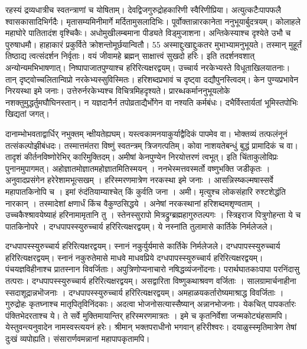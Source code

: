 रहस्यं द्रव्यधात्रीच स्वतन्त्राणां च योषिताम्।
 देवद्विजगुरुद्रोहकारिणी स्वैरिणीप्रिया।
 अत्युत्कटैःपापफलै श्वासकासादिभिर्गदैः।
 मृतासम्यमिनीमार्गे मर्दितामुसलादिभिः।
 पूर्वोक्तान्नारकानेता ननुभूयार्बुदत्रयम्।
 कोलाहले महाघोरे पातितादंश वृश्चिकैः।
 अधोमुखीलम्बमाना पीड्यते विड्मुजाशना।
 अन्तिकेस्याश्च दृश्येते उभौ च पुरुषाधमौ।
 हाहाकारं प्रकुर्विते क्रोशन्तोमूर्छयान्वितौ।
 55 अस्माद्दुःखाद्दुःकतर मुभाभ्यामनुभूयते।
 तस्मान् मुहूर्तं तिष्ठाद्य त्वत्संदर्शन निर्वृताः।
 वयं जीवामहे ब्रह्मन् साक्षात्त्वं सुखदो हरिः।
 इति तदर्शनवशात् अन्योन्यमभिभाषणात्।
 निष्पापाजातपुण्याश्च हरिरित्यक्षरद्वयम्।
 उच्चार्य नरकेभ्यस्ते विधूताखिलयातनाः।
 तान् दृष्ट्वोच्चलितान्विप्रो नरकेभ्यस्सुविस्मितः।
 हरिशब्दप्रभावं च दृष्ट्वा दद्यौपुनस्त्विदम्।
 केन पुण्यप्रभावेन निरयस्था इमे जनाः।
 उत्तेरुर्नरकेभ्यश्च विचित्रमिहदृश्यते।
 प्रारब्धकर्माननुभूयलोके नशक्तुमुद्धर्तुमघौघिनस्तान्।
 न यज्ञदानैर्न तपोव्रताद्यैर्भोगेन वा नश्यति कर्मबंधः।
 दभैर्विस्तार्यतां भूमिस्तपोभिः खिद्यतां जगत्।
 
दानाम्भोभवताद्वार्धिर् नभुक्तम् न्क्षीयतेह्यघम्।
 यस्त्वकामनयाकुर्याद्वैदिकं पापमेव वा।
 भोक्तव्यं तत्फलंनूनं तत्संकल्पोझीबंधदः।
 तस्मात्तमंतरा विष्णुं स्वतन्त्रम् त्रिजगत्पतिम्।
 कोवा नाशयतेबन्धुं बुद्धं प्रामादिकं च वा।
 तादृशं कीर्तनविष्णोरेभिर् कारिमुक्तिदम्।
 अमीषां केनपुण्येन निरयोत्तरणं त्वभूत्।
 इति चिंताकुलोविप्रः पुनानमुपागमत्।
 अहोज्ञातमोज्ञातमहोज्ञातमितिस्मयन् ।
 ननभेस्मत्तवस्मर्तो वष्णुभक्ति जडीकृतः ।
 अनुवादप्रसंगेन हरेरेशामभूत्सखम् ।
 हरिस्मरणमात्रेण नरकस्था इमे जनाः ।
 आसन्निस्ष्कल्मषास्सर्वे महापातकिनोपि च ।
 इमां रुंदंतियाम्याश्चेत् किं कुर्वति जना ।
 अमी।
 मृत्युश्च लोकसंहारि रुश्टशेद्धंति नारकान् ।
 तस्मादेशां क्षणार्धं किंच वैकुण्ठसिद्धये ।
 अनेषां नरकस्थानां हरिशब्दमशृण्वताम् ।
 उच्चकैश्श्रावयेष्याहं हरिनामामृतानि तु ।
 स्तेनस्सुरापो मित्रद्रुग्ब्रह्महागुरुतल्पगः ।
 स्त्रिइराज पित्रुगोहन्ता ये च पातकिनोपरे ।
 दग्धपापस्स्युरुच्चार्य हरिरित्यक्षरद्वयम्।
 ये नस्नांति तुलामासे कार्तिके निर्मलेजले।
 
दग्धपापस्स्युरुच्चार्य हरिरित्यक्षरद्वयम्।
 स्नानं नकुर्युर्यमासे कार्तिके निर्मलेजले।
 दग्धपापस्स्युरुच्चार्य हरिरित्यक्षरद्वयम्।
 स्नानं नकुरुतेमासे माधवे माधवप्रिये दग्धपापस्स्युरुच्चार्य हरिरित्यक्षरद्वयम्।
 पंचयज्ञविहीनाश्च प्रातस्नान विवर्जिताः।
 अपुत्रिणोप्यनाचारो नषिद्धव्यंजनोंदनाः।
 परार्थघातकाःपापा परनिंदासु तत्पराः।
 दग्धपापस्स्युरुच्चार्य हरिरित्यक्षरद्वयम्।
 असद्वारिता विष्णुकथाश्रवण वर्जिताः ।
 सालग्रामार्चनाहीना स्सदाशूद्रान्नभॊजनाः ।
 दग्धपापस्स्युरुच्चार्य हरिरित्यक्षरद्वयम्।
 अमहाळयकर्तारोष्यमाश्राद्ध विवर्जिताः ।
 गुरुद्रोहः कृतघ्नाश्च मातृपितृविनिंदकाः।
 अदत्वा भोजनोसत्यास्सैष्यान् अन्नानभोजनाः।
 येकचित् पापकर्तारः पंक्तिभेदरताश्च ये।
 ते सर्वे मुक्तिमायान्तिर् हरिस्मरणमात्रतः ।
 इमे च कृतनिर्वेशा जन्मकोट्यंहसामपि।
 येस्तुवन्त्यनुवादेन नामस्वस्त्ययनं हरेः।
 श्रीमान् भक्तपराधीनो भगवान् हरिरीश्वरः।
 दयाळुस्स्मृतिमात्रेण तेषां दुःखं व्यपोह्यति।
 संसारार्णवमन्नानां महापापकृतामपि।
 
